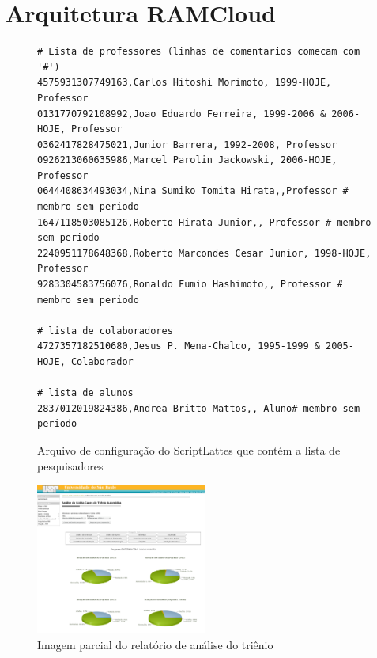 \chapter{Arquitetura RAMCloud}
\label{ch:3}


\begin{figure}[H]
\begin{verbatim}
# Lista de professores (linhas de comentarios comecam com '#')
4575931307749163,Carlos Hitoshi Morimoto, 1999-HOJE, Professor
0131770792108992,Joao Eduardo Ferreira, 1999-2006 & 2006-HOJE, Professor
0362417828475021,Junior Barrera, 1992-2008, Professor
0926213060635986,Marcel Parolin Jackowski, 2006-HOJE, Professor
0644408634493034,Nina Sumiko Tomita Hirata,,Professor # membro sem periodo
1647118503085126,Roberto Hirata Junior,, Professor # membro sem periodo
2240951178648368,Roberto Marcondes Cesar Junior, 1998-HOJE, Professor
9283304583756076,Ronaldo Fumio Hashimoto,, Professor # membro sem periodo

# lista de colaboradores
4727357182510680,Jesus P. Mena-Chalco, 1995-1999 & 2005-HOJE, Colaborador

# lista de alunos
2837012019824386,Andrea Britto Mattos,, Aluno# membro sem periodo
\end{verbatim}
\caption{Arquivo de configuração do ScriptLattes que contém a lista de pesquisadores}
\label{lst:slattes}
\end{figure}


\begin{figure}[H]
    \centering \includegraphics[width=0.5\textwidth]{figuras/trienio.png}
    \caption{Imagem parcial do relatório de análise do triênio}
    \label{fig:trim}
\end{figure} 

